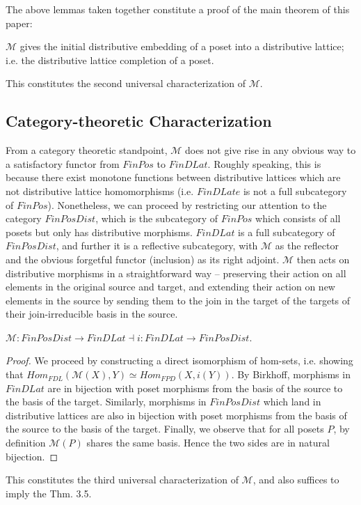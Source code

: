 \documentclass[hoptionsi,review,format=sigplan]{acmart}
\theoremstyle{definition}
\newcommand{\Mcc}{\mathcal{M}}
\begin{document}
The above lemmas taken together constitute a proof of the main theorem of this paper:
\begin{theorem}

\(\Mcc\) gives the initial distributive embedding of a poset into a distributive lattice; i.e. the distributive lattice completion of a poset.
\end{theorem}

This constitutes the second universal characterization of \(\Mcc\).

\subsection{Category-theoretic Characterization}

From a category theoretic standpoint, \(\Mcc\) does not give rise in any obvious way to a satisfactory functor from \(FinPos\) to \(FinDLat\). Roughly speaking, this is because there exist monotone functions between distributive lattices which are not distributive lattice homomorphisms (i.e. \(FinDLate\) is not a full subcategory of \(FinPos\)). Nonetheless, we can proceed by restricting our attention to the category \(FinPosDist\), which is the subcategory of \(FinPos\) which consists of all posets but only has distributive morphisms. \(FinDLat\) is a full subcategory of \(FinPosDist\), and further it is a reflective subcategory, with \(\Mcc\) as the reflector and the obvious forgetful functor (inclusion) as its right adjoint. \(\Mcc\) then acts on distributive morphisms in a straightforward way -- preserving their action on all elements in the original source and target, and extending their action on new elements in the source by sending them to the join in the target of the targets of their join-irreducible basis in the source.

\begin{theorem}
\(\Mcc : FinPosDist \rightarrow FinDLat \allowbreak  \dashv \allowbreak i : FinDLat \rightarrow FinPosDist\).
\end{theorem}

\begin{proof}
We proceed by constructing a direct isomorphism of hom-sets, i.e. showing that \(Hom_{FDL}(\Mcc(X),Y) \allowbreak \simeq \allowbreak Hom_{FPD}(X,i(Y))\). By Birkhoff, morphisms in \(FinDLat\) are in bijection with poset morphisms from the basis of the source to the basis of the target. Similarly, morphisms in \(FinPosDist\) which land in distributive lattices are also in bijection with poset morphisms from the basis of the source to the basis of the target. Finally, we observe that for all posets \(P\), by definition \(\Mcc(P)\) shares the same basis. Hence the two sides are in natural bijection.
\end{proof}
This constitutes the third universal characterization of \(\Mcc\), and also suffices to imply the Thm. 3.5. 
\end{document}
